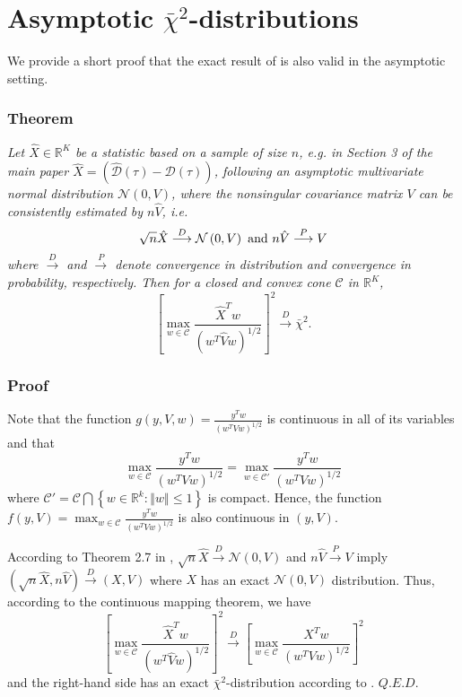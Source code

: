 \documentclass[times,doublespace]{simauth_amod}
\begin{document}
\section{Asymptotic $\bar{\chi}^{2}$-distributions\label{sec:Asymptotic-chibarsqr}}
\label{sec:asymp_chibarsq}

We provide a short proof that the exact result of \cite{Shapiro2003} is also valid in the asymptotic setting.

\subsubsection*{\textbf{Theorem}}

\emph{Let $\hat{X}\in\mathbb{R}^{K}$ be a statistic based on a sample of size $n$, e.g. in Section 3 of the main paper $\hat{X}=\left(\hat{\mathcal{D}}(\tau)-\mathcal{D}(\tau)\right)$, following an asymptotic multivariate normal distribution $\mathcal{N}\left(0,V\right)$, where the nonsingular covariance matrix $V$ can be consistently estimated by $n\hat{V}$, i.e. 
	\[
	\sqrt{n}\hat{X}\overset{D}{\longrightarrow}\mathcal{N}\left(0,V\right)\ \textnormal{and}\ n\hat{V}\overset{P}{\longrightarrow}V
	\]
	where $\overset{D}{\longrightarrow}$ and $\overset{P}{\longrightarrow}$ denote convergence in distribution and convergence in probability, respectively. 
	Then for a closed and convex cone $\mathcal{C}$ in $\mathbb{R}^{K}$,
	\[
	\left[\max_{w\in\mathcal{C}}\frac{\hat{X}^Tw}{\left(w^{T}\hat{V}w\right)^{1/2}}\right]^2\overset{D}{\longrightarrow}\bar{\chi}^{2}.
	\]
}
%
\subsubsection*{\textbf{Proof}}
Note that the function $g\left(y,V,w\right)=\frac{y^Tw}{\left(w^{T}Vw\right)^{1/2}}$ is continuous in all of its variables and that 
$$\max_{w\in\mathcal{C}}\frac{y^Tw}{\left(w^{T}Vw\right)^{1/2}}=\max_{w\in\mathcal{C}'}\frac{y^Tw}{\left(w^{T}Vw\right)^{1/2}}$$
where $\mathcal{C}'=\mathcal{C}\bigcap\left\{w\in\mathbb{R}^k:\left\Vert w\right\Vert\le1\right\}$ is compact. 
Hence, the function $f(y,V)=\max_{w\in\mathcal{C}}\frac{y^Tw}{\left(w^{T}Vw\right)^{1/2}}$ is also continuous in $(y,V)$.

According to Theorem 2.7 in \cite{Vaart2000}, $\sqrt{n}\hat{X}\overset{D}{\longrightarrow}\mathcal{N}(0,V)$ and $n\hat{V}\overset{P}{\longrightarrow}V$ imply $\left(\sqrt{n}\hat{X},n\hat{V}\right)\overset{D}{\longrightarrow}\left(X,V\right)$ where $X$ has an exact $\mathcal{N}(0,V)$ distribution. Thus, according to the continuous mapping theorem, we have 
%
\[
\left[\max_{w\in\mathcal{C}}\frac{\hat{X}^Tw}{\left(w^{T}\hat{V}w\right)^{1/2}}\right]^2\overset{D}{\longrightarrow}
\left[\max_{w\in\mathcal{C}}\frac{X^Tw}{\left(w^{T}Vw\right)^{1/2}}\right]^2
\]
%
and the right-hand side has an exact $\bar{\chi}^{2}$-distribution according to \cite{Shapiro2003}. $Q.E.D.$
\end{document}
